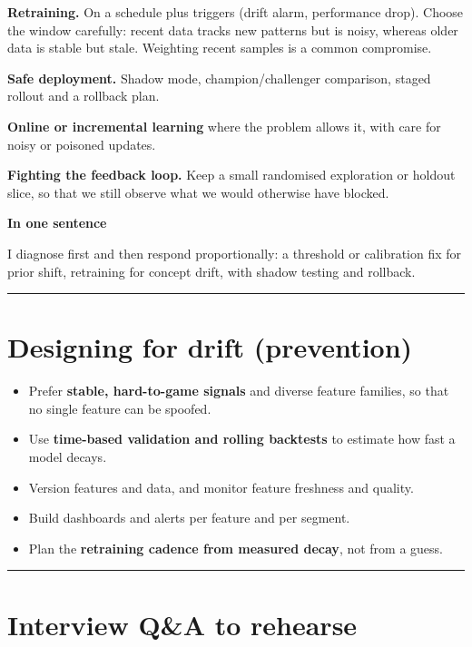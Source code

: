 \documentclass[11pt]{article}
\begin{document}
\textbf{Retraining.} On a schedule plus triggers (drift alarm, performance drop). Choose the window carefully: recent data tracks new patterns but is noisy, whereas older data is stable but stale. Weighting recent samples is a common compromise.

\textbf{Safe deployment.} Shadow mode, champion/challenger comparison, staged rollout and a rollback plan.

\textbf{Online or incremental learning} where the problem allows it, with care for noisy or poisoned updates.

\textbf{Fighting the feedback loop.} Keep a small randomised exploration or holdout slice, so that we still observe what we would otherwise have blocked.

\textbf{In one sentence}

I diagnose first and then respond proportionally: a threshold or calibration fix for prior shift, retraining for concept drift, with shadow testing and rollback.

\vspace{5mm}
\hrule
\vspace{5mm}

\section{Designing for drift (prevention)}

\begin{itemize}
    \item Prefer \textbf{stable, hard-to-game signals} and diverse feature families, so that no single feature can be spoofed.
    \item Use \textbf{time-based validation and rolling backtests} to estimate how fast a model decays.
    \item Version features and data, and monitor feature freshness and quality.
    \item Build dashboards and alerts per feature and per segment.
    \item Plan the \textbf{retraining cadence from measured decay}, not from a guess.
\end{itemize}

\vspace{5mm}
\hrule
\vspace{5mm}

\section{Interview Q\&A to rehearse}
\end{document}
